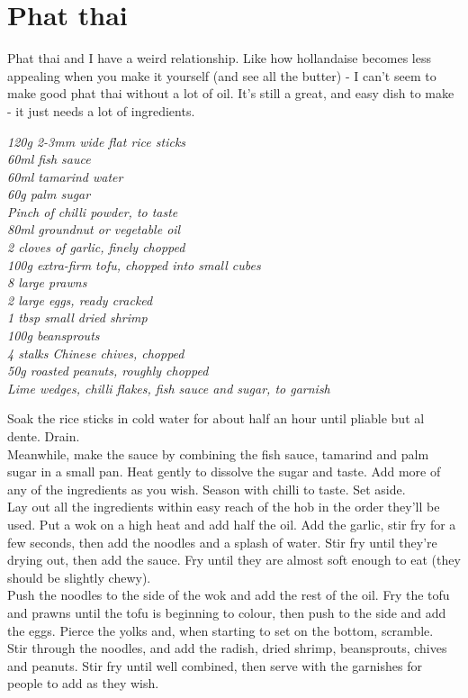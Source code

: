 \documentclass{tufte-book}
\begin{document}
\newpage

\section{Phat thai}

Phat thai and I have a weird relationship. Like how hollandaise becomes less appealing when you make it yourself (and see all the butter) - I can't seem to make good phat thai without a lot of oil. It's still a great, and easy dish to make - it just needs a lot of ingredients.

\smallskip
\emph{120g 2-3mm wide flat rice sticks
\\60ml fish sauce
\\60ml tamarind water
\\60g palm sugar
\\Pinch of chilli powder, to taste
\\80ml groundnut or vegetable oil
\\2 cloves of garlic, finely chopped
\\100g extra-firm tofu, chopped into small cubes
\\8 large prawns
\\2 large eggs, ready cracked
\\1 tbsp small dried shrimp
\\100g beansprouts
\\4 stalks Chinese chives, chopped
\\50g roasted peanuts, roughly chopped
\\Lime wedges, chilli flakes, fish sauce and sugar, to garnish}

\smallskip
Soak the rice sticks in cold water for about half an hour until pliable but al dente. Drain.
\\Meanwhile, make the sauce by combining the fish sauce, tamarind and palm sugar in a small pan. Heat gently to dissolve the sugar and taste. Add more of any of the ingredients as you wish. Season with chilli to taste. Set aside.
\\Lay out all the ingredients within easy reach of the hob in the order they'll be used. Put a wok on a high heat and add half the oil. Add the garlic, stir fry for a few seconds, then add the noodles and a splash of water. Stir fry until they're drying out, then add the sauce. Fry until they are almost soft enough to eat (they should be slightly chewy).
\\Push the noodles to the side of the wok and add the rest of the oil. Fry the tofu and prawns until the tofu is beginning to colour, then push to the side and add the eggs. Pierce the yolks and, when starting to set on the bottom, scramble.
\\Stir through the noodles, and add the radish, dried shrimp, beansprouts, chives and peanuts. Stir fry until well combined, then serve with the garnishes for people to add as they wish.
\end{document}
